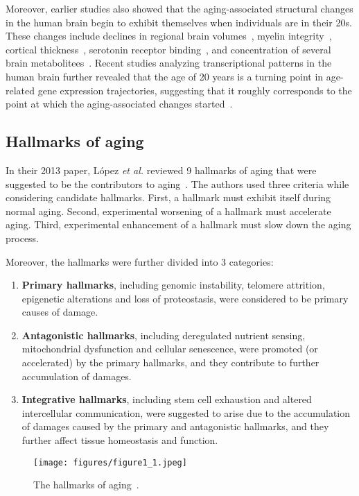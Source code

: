 Moreover, earlier studies also showed that the aging-associated structural changes in the human brain begin to exhibit themselves when individuals are in their 20s.
These changes include declines in regional brain volumes~\cite{Sowell2003}, myelin integrity~\cite{Sullivan2006}, cortical thickness~\cite{Salat2004, Magnotta1999},
serotonin receptor binding~\cite{Sheline2002}, and concentration of several brain metabolitees~\cite{Salthouse2009, Kadota2001}.
Recent studies analyzing transcriptional patterns in the human brain further revealed that the age of 20 years is a turning point in age-related gene expression trajectories,
suggesting that it roughly corresponds to the point at which the aging-associated changes started~\cite{Somel2010, Colantuoni2011, Donertas2017}.

\subsection{Hallmarks of aging}
In their 2013 paper, López \textit{et al.} reviewed 9 hallmarks of aging that were suggested to be the contributors to aging~\cite{Lopez2013}.
The authors used three criteria while considering candidate hallmarks. 
First, a hallmark must exhibit itself during normal aging.
Second, experimental worsening of a hallmark must accelerate aging.
Third, experimental enhancement of a hallmark must slow down the aging process. 

Moreover, the hallmarks were further divided into 3 categories:
\begin{enumerate}
    \item \textbf{Primary hallmarks}, including genomic instability, telomere attrition, epigenetic alterations and loss of proteostasis,
    were considered to be primary causes of damage.
    \item \textbf{Antagonistic hallmarks}, including deregulated nutrient sensing, mitochondrial dysfunction and cellular senescence,
    were promoted (or accelerated) by the primary hallmarks, and they contribute to further accumulation of damages.
    \item \textbf{Integrative hallmarks}, including stem cell exhaustion and altered intercellular communication, 
    were suggested to arise due to the accumulation of damages caused by the primary and antagonistic hallmarks,
    and they further affect tissue homeostasis and function.
\end{enumerate}

\begin{figure}[h]
    \centering
    \texttt{[image: figures/figure1\_1.jpeg]}
    \caption{The hallmarks of aging~\cite{Lopez2013}.}
    \label{fig:fig1.1}
\end{figure}


